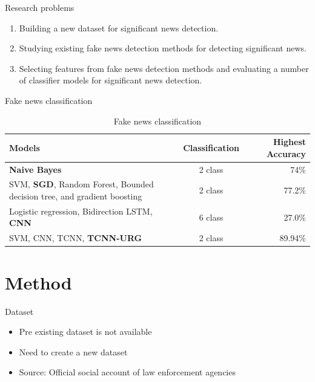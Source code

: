 \documentclass[12pt]{beamer}
\begin{document}
\begin{frame}{Research problems}
    \begin{enumerate}
        \item Building a new dataset for significant news detection.
        \item Studying existing fake news detection methods for detecting significant news.
        \item Selecting features from fake news detection methods and evaluating a number of classifier models for significant news detection.
    \end{enumerate}
\end{frame}

\begin{frame}{Fake news classification}
    \begin{table}[ht]
    \centering
    \begin{tabular}{ p{4cm} c r }
    \hline
    \textbf{Models} & \textbf{Classification} & \textbf{Highest Accuracy} \\
    \hline
    \textbf{Naive Bayes} & 2 class & 74\% \\
    \hline
    SVM, \textbf{SGD}, Random Forest, Bounded decision tree, and gradient boosting & 2 class & 77.2\% \\
    \hline
    Logistic regression, Bidirection LSTM, \textbf{CNN} & 6 class & 27.0\% \\
    \hline
    SVM, CNN, TCNN, \textbf{TCNN-URG} & 2 class & 89.94\% \\
    \hline
    \end{tabular}
    \caption{Fake news classification}
    \label{tbl:fake_news_classification_performance}
    \end{table}

\end{frame}

\section{Method}

\begin{frame}{Dataset}
    \begin{itemize}
        \item Pre existing dataset is not available
        \item Need to create a new dataset
        \item Source: Official social account of law enforcement agencies
    \end{itemize}
\end{frame}
\end{document}
